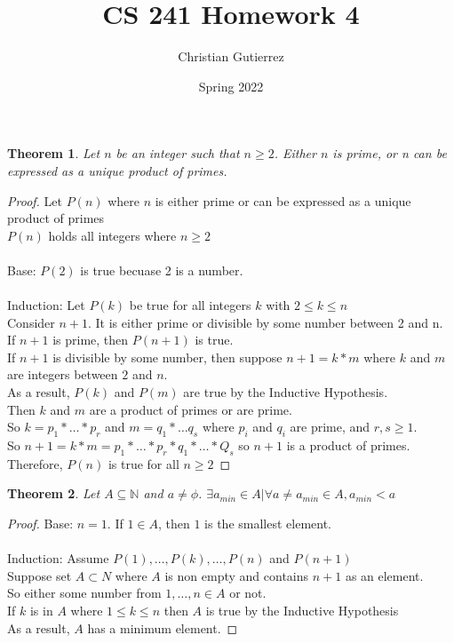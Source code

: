 \documentclass{article}
\title{CS 241 Homework 4}
\author{Christian Gutierrez}
\date{Spring 2022}
\newtheorem{theorem}{Theorem}
\begin{document}
\maketitle

\newpage

\begin{theorem}
    Let $n$ be an integer such that $ n \geq 2$. Either $n$ is prime, or n can be expressed as a unique product of primes.
\end{theorem}
\begin{proof}
    Let $P(n)$ where $n$ is either prime or can be expressed as a unique product of primes \\
    $P(n)$ holds all integers where $n \geq 2$\\\\
    Base: $P(2)$ is true becuase 2 is a number.\\\\
    Induction: Let $P(k)$ be true for all integers $k$ with $2 \leq k \leq n$\\
    Consider $n+1$. It is either prime or divisible by some number between 2 and n.\\
    If $n+1$ is prime, then $P(n+1)$ is true.\\
    If $n+1$ is divisible by some number, then suppose $n+1 = k*m$ where $k$ and $m$ are integers between $2$ and $n$.\\
    As a result, $P(k)$ and $P(m)$ are true by the Inductive Hypothesis.\\
    Then $k$ and $m$ are a product of primes or are prime.\\
    So $k=p_{1}*\ldots * p_{r} $ and $ m = q_{1}*\ldots q_{s}$ where $p_{i}$ and $q_{i}$ are prime, and $r,s \geq 1$.\\
    So $n+1= k * m = p_{1}*\ldots * p_{r} * q_{1}* \ldots * Q_{s}$ so $n+1$ is a product of primes.\\
    Therefore, $P(n)$ is true for all $n \geq 2$
  \end{proof}


\newpage

\begin{theorem}
  Let $ A \subseteq \mathbb{N}$ and $a \ne \phi$. $\exists a_{min} \in A 
  | \forall a \ne a_{min} \in A, a_{min} < a$ 
\end{theorem}
\begin{proof}
  Base: $n=1$. If $1 \in A$, then $1$ is the smallest element.\\\\
  Induction: Assume $P(1),\ldots, P(k),\ldots,P(n)$ and $P(n+1)$\\
  Suppose set $A \subset N $ where $A$ is non empty and contains $n+1$ as an element.\\
  So either some number from $1,\ldots, n \in A$ or not.\\
  If $k$ is in $A$ where $1 \leq k \leq n$ then $A$ is true by the Inductive Hypothesis\\
  As a result, $A$ has a minimum element.
  
\end{proof}
\end{document}
